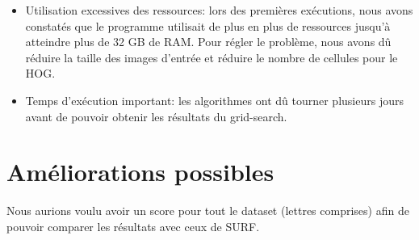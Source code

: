 \begin{itemize}
\item Utilisation excessives des ressources: lors des premières exécutions, nous avons constatés que le programme utilisait de plus en plus de ressources jusqu'à atteindre plus de 32 GB de RAM. Pour régler le problème, nous avons dû réduire la taille des images d'entrée et réduire le nombre de cellules pour le HOG.

\item Temps d'exécution important: les algorithmes ont dû tourner plusieurs jours avant de pouvoir obtenir les résultats du grid-search.

\end{itemize}

\section{Améliorations possibles}
Nous aurions voulu avoir un score pour tout le dataset (lettres comprises) afin de pouvoir comparer les résultats avec ceux de SURF.

\newpage
